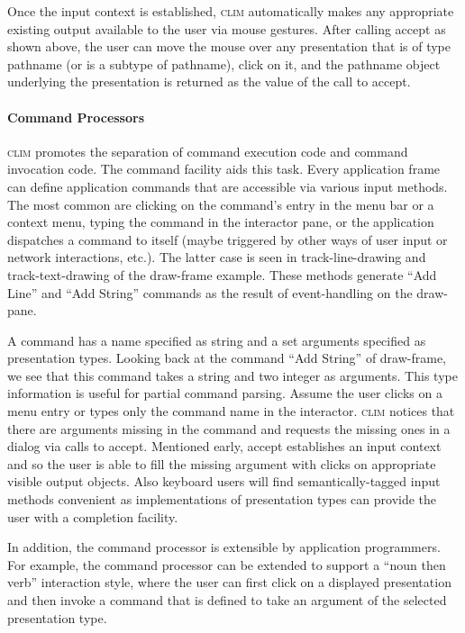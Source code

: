 \documentclass[twocolumn,a4paper]{article}
\newcommand {\code}[1]{{\sffamily #1}}
\newcommand {\CLIM}{\textsc{clim}}
\let\class\code
\let\method\code
\begin{document}
Once the input context is established, \CLIM{} automatically makes any
appropriate existing output available to the user via mouse gestures.
After calling \method{accept} as shown above, the user can move the
mouse over any presentation that is of type pathname (or is a subtype
of pathname), click on it, and the pathname object underlying the
presentation is returned as the value of the call to \code{accept}.

\paragraph*{Command Processors} \CLIM{} promotes the separation of
command execution code and command invocation code. The command
facility aids this task. Every application frame can define
application commands that are accessible via various input methods.
The most common are clicking on the command's entry in the menu bar or
a context menu, typing the command in the interactor pane, or the
application dispatches a command to itself (maybe triggered by other
ways of user input or network interactions, etc.). The latter case is
seen in \code{track-line-drawing} and \code{track-text-drawing} of the
\class{draw-frame} example. These methods generate ``Add Line'' and
``Add String'' commands as the result of event-handling on the
draw-pane.

A command has a name specified as string and a set arguments specified
as presentation types.  Looking back at the command ``Add String'' of
draw-frame, we see that this command takes a string and two integer as
arguments.  This type information is useful for partial command
parsing. Assume the user clicks on a menu entry or types only the
command name in the interactor. \CLIM{} notices that there are
arguments missing in the command and requests the missing ones in a
dialog via calls to \code{accept}. Mentioned early, \code{accept}
establishes an input context and so the user is able to fill the
missing argument with clicks on appropriate visible output objects.
Also keyboard users will find semantically-tagged input methods
convenient as implementations of presentation types can provide the
user with a completion facility.

In addition, the command processor is extensible by application
programmers. For example, the command processor can be extended to
support a ``noun then verb'' interaction style, where the user can
first click on a displayed presentation and then invoke a command that
is defined to take an argument of the selected presentation type.
\end{document}
